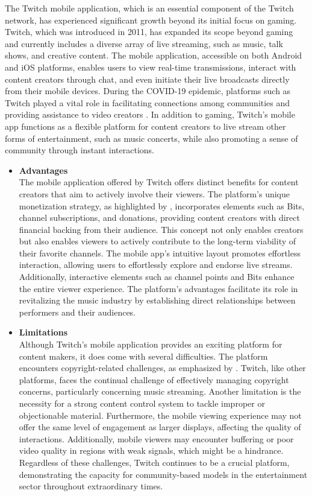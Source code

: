 The Twitch mobile application, which is an essential component of the Twitch network, has experienced significant growth beyond its initial focus on gaming. Twitch, which was introduced in 2011, has expanded its scope beyond gaming and currently includes a diverse array of live streaming, such as music, talk shows, and creative content. The mobile application, accessible on both Android and iOS platforms, enables users to view real-time transmissions, interact with content creators through chat, and even initiate their live broadcasts directly from their mobile devices. During the COVID-19 epidemic, platforms such as Twitch played a vital role in facilitating connections among communities and providing assistance to video creators \parencite{leger21}. In addition to gaming, Twitch's mobile app functions as a flexible platform for content creators to live stream other forms of entertainment, such as music concerts, while also promoting a sense of community through instant interactions. \pagebreak
\begin{itemize}[\label{}]
    \item \textbf{Advantages} \\
    The mobile application offered by Twitch offers distinct benefits for content creators that aim to actively involve their viewers. The platform's unique monetization strategy, as highlighted by \textcite{leger21}, incorporates elements such as Bits, channel subscriptions, and donations, providing content creators with direct financial backing from their audience. This concept not only enables creators but also enables viewers to actively contribute to the long-term viability of their favorite channels. The mobile app's intuitive layout promotes effortless interaction, allowing users to effortlessly explore and endorse live streams. Additionally, interactive elements such as channel points and Bits enhance the entire viewer experience. The platform's advantages facilitate its role in revitalizing the music industry by establishing direct relationships between performers and their audiences.
    \item \textbf{Limitations} \\
    Although Twitch's mobile application provides an exciting platform for content makers, it does come with several difficulties. The platform encounters copyright-related challenges, as emphasized by \textcite{leger21}. Twitch, like other platforms, faces the continual challenge of effectively managing copyright concerns, particularly concerning music streaming. Another limitation is the necessity for a strong content control system to tackle improper or objectionable material. Furthermore, the mobile viewing experience may not offer the same level of engagement as larger displays, affecting the quality of interactions. Additionally, mobile viewers may encounter buffering or poor video quality in regions with weak signals, which might be a hindrance. Regardless of these challenges, Twitch continues to be a crucial platform, demonstrating the capacity for community-based models in the entertainment sector throughout extraordinary times.
\end{itemize}
\pagebreak

